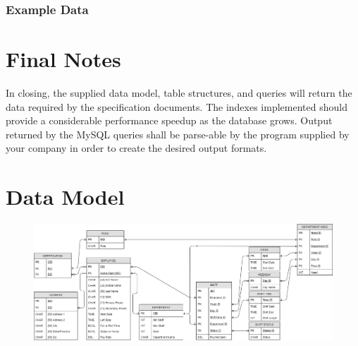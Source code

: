 \documentclass[letter,12pt]{texMemo}
\begin{document}
\subsubsection*{Example Data}
\begin{changemargin}{-1.25cm}{-1.25cm}
	\begin{center}
		
	\end{center}
\end{changemargin}

\section*{Final Notes}
In closing, the supplied data model, table structures, and queries will return the data required by the specification documents. The indexes implemented should provide a considerable performance speedup as the database grows. Output returned by the MySQL queries shall be parse-able by the program supplied by your company in order to create the desired output formats.

\newpage
\section*{Data Model}
\begin{figure}[H]
	\centering
	\includegraphics[angle=90, height=\textheight]{er_diag.png}
\end{figure}



%
%
\end{document}
